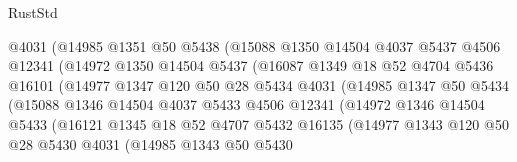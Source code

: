 \begin{lexlean}{RustStd}
\begin{coremodule}
                        @4031
                        (@14985
                          @1351
                          @50
                          @5438
                          (@15088
                            @1350
                            @14504
                            @4037
                            @5437
                            @4506
                            @12341
                            (@14972
                              @1350
                              @14504
                              @5437
                              (@16087
                                @1349
                                @18
                                @52
                                @4704
                                @5436
                                @16101
                                (@14977
                                  @1347
                                  @120
                                  @50
                                  @28
                                  @5434
                                  @4031
                                  (@14985
                                    @1347
                                    @50
                                    @5434
                                    (@15088
                                      @1346
                                      @14504
                                      @4037
                                      @5433
                                      @4506
                                      @12341
                                      (@14972
                                        @1346
                                        @14504
                                        @5433
                                        (@16121
                                          @1345
                                          @18
                                          @52
                                          @4707
                                          @5432
                                          @16135
                                          (@14977
                                            @1343
                                            @120
                                            @50
                                            @28
                                            @5430
                                            @4031
                                            (@14985
                                              @1343
                                              @50
                                              @5430

\end{coremodule}
\end{lexlean}
